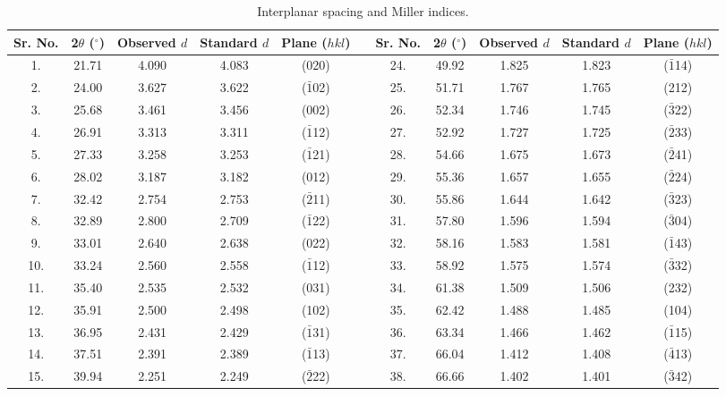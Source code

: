 \documentclass[10pt]{NSP1}
\begin{document}
\begin{table}[t]
\centering
\caption{Interplanar spacing and Miller indices.}
\label{tab1}
\setlength{\tabcolsep}{4.5pt}
\footnotesize
\begin{tabular}{ccccc|c|ccccc}
\toprule
\textbf{Sr. No.} & \textbf{2$\theta$ ($^\circ$)} & \textbf{Observed $d$} & \textbf{Standard $d$} & \textbf{Plane ($hkl$)} & \quad & \textbf{Sr. No.} & \textbf{2$\theta$ ($^\circ$)} & \textbf{Observed $d$} & \textbf{Standard $d$} & \textbf{Plane ($hkl$)} \\
\midrule
1.  & 21.71 & 4.090 & 4.083 & (020)          & & 24. & 49.92 & 1.825 & 1.823 & ($\bar{1}$14) \\
2.  & 24.00 & 3.627 & 3.622 & ($\bar{1}$02)  & & 25. & 51.71 & 1.767 & 1.765 & (212)         \\
3.  & 25.68 & 3.461 & 3.456 & (002)          & & 26. & 52.34 & 1.746 & 1.745 & ($\bar{3}$22) \\
4.  & 26.91 & 3.313 & 3.311 & ($\bar{1}$12)  & & 27. & 52.92 & 1.727 & 1.725 & ($\bar{2}$33) \\
5.  & 27.33 & 3.258 & 3.253 & ($\bar{1}$21)  & & 28. & 54.66 & 1.675 & 1.673 & ($\bar{2}$41) \\
6.  & 28.02 & 3.187 & 3.182 & (012)          & & 29. & 55.36 & 1.657 & 1.655 & ($\bar{2}$24) \\
7.  & 32.42 & 2.754 & 2.753 & ($\bar{2}$11)  & & 30. & 55.86 & 1.644 & 1.642 & ($\bar{3}$23) \\
8.  & 32.89 & 2.800 & 2.709 & ($\bar{1}$22)  & & 31. & 57.80 & 1.596 & 1.594 & ($\bar{3}$04) \\
9.  & 33.01 & 2.640 & 2.638 & (022)          & & 32. & 58.16 & 1.583 & 1.581 & ($\bar{1}$43) \\
10. & 33.24 & 2.560 & 2.558 & ($\bar{1}$12)  & & 33. & 58.92 & 1.575 & 1.574 & ($\bar{3}$32) \\
11. & 35.40 & 2.535 & 2.532 & (031)          & & 34. & 61.38 & 1.509 & 1.506 & (232)         \\
12. & 35.91 & 2.500 & 2.498 & (102)          & & 35. & 62.42 & 1.488 & 1.485 & (104)         \\
13. & 36.95 & 2.431 & 2.429 & ($\bar{1}$31)  & & 36. & 63.34 & 1.466 & 1.462 & ($\bar{1}$15) \\
14. & 37.51 & 2.391 & 2.389 & ($\bar{1}$13)  & & 37. & 66.04 & 1.412 & 1.408 & ($\bar{4}$13) \\
15. & 39.94 & 2.251 & 2.249 & ($\bar{2}$22)  & & 38. & 66.66 & 1.402 & 1.401 & ($\bar{3}$42) \\

\end{tabular}
\end{table}
\end{document}
